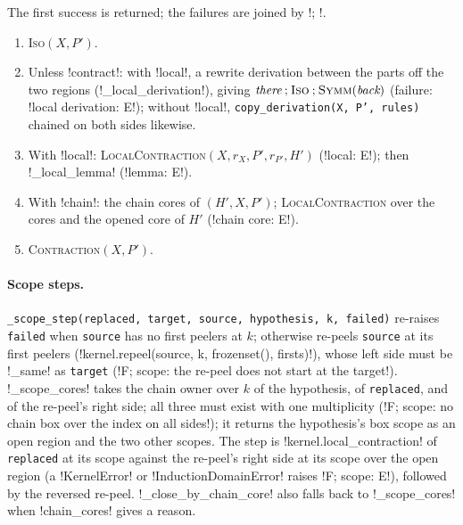 \begin{algorithm}\label{alg:kernel-step-theorem}
The first success is returned; the failures are joined by \code!; !.
\begin{enumerate}
\item \textsc{Iso}$(X, P')$.
\item Unless \code!contract!: with \code!local!, a rewrite derivation between the parts off the two regions (\py!_local_derivation!), giving $\textit{there}\mathbin{;}\textsc{Iso}\mathbin{;}\textsc{Symm}(\textit{back})$ (failure: \code!local derivation: E!); without \code!local!, \texttt{copy\_\allowbreak{}derivation(\allowbreak{}X,\allowbreak{} P',\allowbreak{} rules)} chained on both sides likewise.
\item With \code!local!: \textsc{LocalContraction}$(X, r_X, P', r_{P'}, H')$ (\code!local: E!); then \py!_local_lemma! (\code!lemma: E!).
\item With \code!chain!: the chain cores of $(H', X, P')$; \textsc{LocalContraction} over the cores and the opened core of $H'$ (\code!chain core: E!).
\item \textsc{Contraction}$(X, P')$.
\end{enumerate}
\end{algorithm}

\paragraph{Scope steps.} \texttt{\_\allowbreak{}scope\_\allowbreak{}step(\allowbreak{}replaced,\allowbreak{} target,\allowbreak{} source,\allowbreak{} hypothesis,\allowbreak{} k,\allowbreak{} failed)} re-raises \texttt{failed} when \texttt{source} has no first peelers at $k$; otherwise re-peels \texttt{source} at its first peelers (\py!kernel.repeel(source, k, frozenset(), firsts)!), whose left side must be \py!_same! as \texttt{target} (\code!F; scope: the re-peel does not start at the target!). \py!_scope_cores! takes the chain owner over $k$ of the hypothesis, of \texttt{replaced}, and of the re-peel's right side; all three must exist with one multiplicity (\code!F; scope: no chain box over the index on all sides!); it returns the hypothesis's box scope as an open region and the two other scopes. The step is \py!kernel.local_contraction! of \texttt{replaced} at its scope against the re-peel's right side at its scope over the open region (a \py!KernelError! or \py!InductionDomainError! raises \code!F; scope: E!), followed by the reversed re-peel. \py!_close_by_chain_core! also falls back to \py!_scope_cores! when \py!chain_cores! gives a reason.

